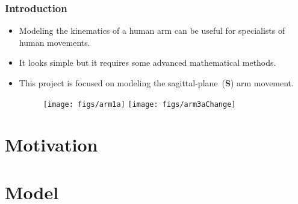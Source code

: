 \documentclass{beamer}
\begin{document}
\begin{frame}
\frametitle{Introduction}
\begin{itemize}
\item Modeling the kinematics of a human arm can be useful for specialists of human movements.
\item It looks simple but it requires some advanced mathematical methods.
\item This project is focused on modeling the sagittal-plane~(\textbf{S}) arm movement.
\begin{figure}
  \centering
  \texttt{[image: figs/arm1a]}
  \hspace{10mm}
  \texttt{[image: figs/arm3aChange]}
\end{figure}
\end{itemize}
\end{frame}

\section{Motivation} %


\section{Model}
\end{document}
